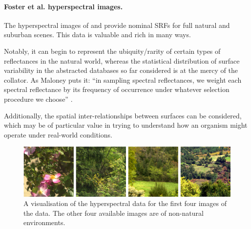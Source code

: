 \paragraph{Foster et al. hyperspectral images.}
The hyperspectral images of \citet{nascimento_statistics_2002} and \citet{foster_frequency_2006} provide nominal \glspl{SRF} for full natural and suburban scenes. This data is valuable and rich in many ways. 

Notably, it can begin to represent the ubiquity/rarity of certain types of reflectances in the natural world, whereas the statistical distribution of surface variability in the abstracted databases so far considered is at the mercy of the collator. As Maloney puts it: ``in sampling spectral reflectances, we weight each spectral reflectance by its frequency of occurrence under whatever selection procedure we choose'' \cite{maloney_computational_1984}.

Additionally, the spatial inter-relationships between surfaces can be considered, which may be of particular value in trying to understand how an organism might operate under real-world conditions.

\begin{figure}[htbp]
    \includegraphics[max width=\textwidth]{figs/LitRev/Foster.png}
    \caption{A visualisation of the hyperspectral data for the first four images of the \citet{nascimento_statistics_2002} data. The other four available images are of non-natural environments.}
    \label{fig:Foster}
\end{figure} 


